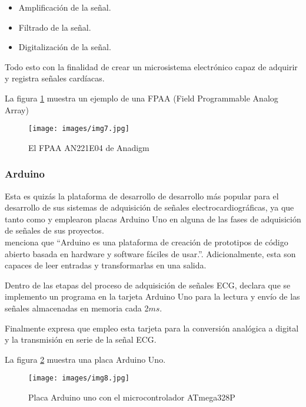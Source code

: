     \begin{itemize}
        \item Amplificación de la señal.
        \item Filtrado de la señal.
        \item Digitalización de la señal.
    \end{itemize}

    Todo esto con la finalidad de crear un microsistema electrónico capaz de adquirir y registra señales cardíacas.

    La figura \ref{fig:FPAA} muestra un ejemplo de una FPAA (Field Programmable Analog Array)

    \begin{figure}[ht!]
        \centering
        \texttt{[image: images/img7.jpg]}
        \caption{El FPAA AN221E04 de Anadigm \citep{bib19}}
        \label{fig:FPAA}
    \end{figure}
    
    \subsubsection{Arduino}
    Esta es quizás la plataforma de desarrollo de desarrollo más popular para el desarrollo de sus sistemas de adquisición de señales electrocardiográficas, ya que tanto \citep{bib9} como \citep{bib10} y \citep{bib12} emplearon placas Arduino Uno en alguna de las fases de adquisición de señales de sus proyectos.\\
    \citet[p. 3]{bib12} menciona que ``Arduino es una plataforma de creación de prototipos de código abierto basada en hardware y software fáciles de usar.''. Adicionalmente, esta son capaces de leer entradas y transformarlas en una salida.

    Dentro de las etapas del proceso de adquisición de señales ECG, \citet[p. 273]{bib12} declara que se implemento un programa en la tarjeta Arduino Uno para la lectura y envío de las señales almacenadas en memoria cada 2$ms$.

    Finalmente \citet[p. 10]{bib10} expresa que empleo esta tarjeta para la conversión analógica a digital y la transmisión en serie de la señal ECG.

    La figura \ref{fig:Arduino} muestra una placa Arduino Uno.

    \begin{figure}[ht!]
        \centering
        \texttt{[image: images/img8.jpg]}
        \caption{Placa Arduino uno con el microcontrolador ATmega328P}
        \label{fig:Arduino}
    \end{figure}
    

